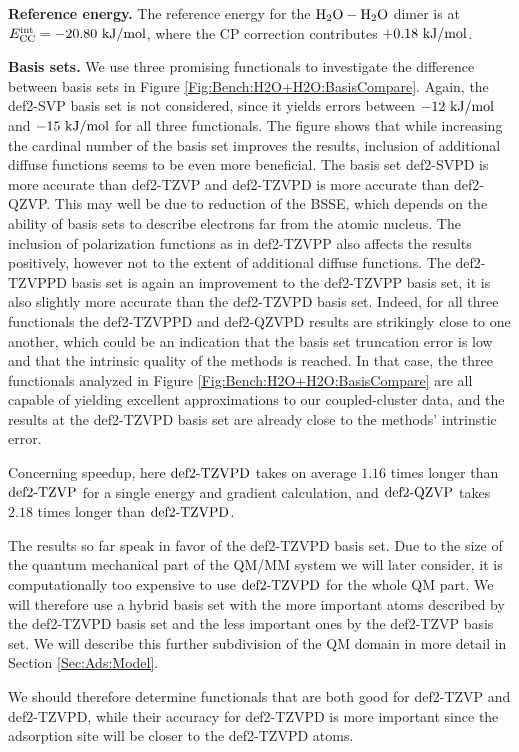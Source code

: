 \textbf{Reference energy.} The reference energy for the $\mbox{\ensuremath{\text H _2 \text O-\text H _2 \text O}}$ dimer is at
\mbox{$E^{\text{int}}_{\text {CC}}=-20.80\ \text {kJ/mol}$}, where the CP correction contributes $+0.18\ \text {kJ/mol}$.

\textbf{Basis sets.} We use three promising functionals to investigate the difference
between basis sets in Figure \ref{Fig:Bench:H2O+H2O:BasisCompare}. Again, the
def2-SVP basis set is not considered, since it yields errors between $-12\ \text {kJ/mol}$ and $-15\ \text {kJ/mol}$ for all three
functionals. The figure shows that while increasing the cardinal number of the
basis set improves the results, inclusion of additional diffuse functions seems to
be even more beneficial. The basis set def2-SVPD is more accurate than def2-TZVP and
def2-TZVPD is more accurate than def2-QZVP.
This may well be due to reduction of the BSSE, which depends on the ability
of basis sets to describe electrons far from the atomic nucleus.
The inclusion of polarization functions as in def2-TZVPP also
affects the results positively, however not to the extent of additional
diffuse functions. The def2-TZVPPD basis set is again an improvement
to the def2-TZVPP basis set, it is also slightly more accurate than the
def2-TZVPD basis set. Indeed, for all three functionals the def2-TZVPPD and
def2-QZVPD results are strikingly close to one another, which could
be an indication that the basis set truncation error is low and that
the intrinsic quality of the methods is reached. In that case, the
three functionals analyzed in Figure \ref{Fig:Bench:H2O+H2O:BasisCompare} are
all capable of yielding excellent approximations to our coupled-cluster data,
and the results at the def2-TZVPD basis set are already close to the
methods' intrinstic error.  

Concerning speedup, here $\text{def2-TZVPD}$ takes on average $1.16$ times longer than
$\text{def2-TZVP}$ for a single energy and gradient calculation, and $\text{def2-QZVP}$ takes $2.18$
times longer than $\text{def2-TZVPD}$.

The results so far speak in favor of the def2-TZVPD basis set. Due 
to the size of the quantum mechanical part of the QM/MM system we will later consider,
it is computationally too expensive to use $\text{def2-TZVPD}$ for the whole
QM part. We will therefore use a hybrid basis set with the more important atoms
described by the def2-TZVPD basis set and the less important ones by the
def2-TZVP basis set. We will describe this further subdivision of the QM domain
in more detail in Section \ref{Sec:Ads:Model}.

We should therefore determine functionals that are both good for def2-TZVP and def2-TZVPD,
while their accuracy for def2-TZVPD is more important since the adsorption site will
be closer to the def2-TZVPD atoms. 

